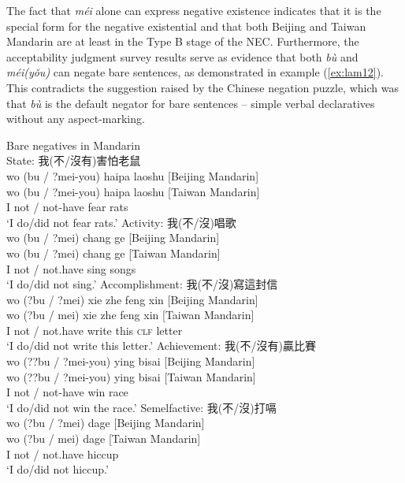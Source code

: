 \documentclass[output=paper,colorlinks,citecolor=brown,chinesefont]{langscibook}
\begin{document}
The fact that \textit{méi} alone can express negative existence indicates that it is the special form for the negative existential and that both Beijing and Taiwan Mandarin are at least in the Type B stage of the NEC. Furthermore, the acceptability judgment survey results serve as evidence that both \textit{bù} and \textit{méi(yǒu)} can negate bare sentences, as demonstrated in example (\ref{ex:lam12}). This contradicts the suggestion raised by the Chinese negation puzzle, which was that \textit{bù} is the default negator for bare sentences – simple verbal declaratives without any aspect-marking.

\let\eachwordtwo=\itshape
\ea Bare negatives in Mandarin \label{ex:lam12}\\
  \ea State: {\cn 我(不/沒有)害怕老鼠} \label{ex:lam12a}\\
  	\glll wo	{(bu / ?mei-you)}	haipa	laoshu	\textup{[Beijing Mandarin]}\\
	{wo} {(bu / ?mei-you)}	{haipa} {laoshu} \textup{[Taiwan Mandarin]}\\
	I {not / not-have} fear rats\\
	\glt `I do/did not fear rats.'
  \ex Activity: {\cn 我(不/沒)唱歌} \label{ex:lam12b}\\
  	\glll wo	{(bu / ?mei)}	chang	ge	\textup{[Beijing Mandarin]}\\
	  {wo}	{(bu / ?mei)} {chang} {ge} \textup{[Taiwan Mandarin]}\\
	I {not / not.have} sing songs\\
	\glt `I do/did not sing.'
  \ex Accomplishment: {\cn 我(不/沒)寫這封信} \label{ex:lam12c}\\
	\glll wo	 {(?bu / ?mei)} xie zhe feng xin \textup{[Beijing Mandarin]}\\
	{wo} {(?bu / mei)} {xie} {zhe} {feng} {xin} \textup{[Taiwan Mandarin]}\\
	I {not / not.have} write this \textsc{clf} letter\\
	\glt `I do/did not write this letter.'
  \ex Achievement: {\cn 我(不/沒有)贏比賽} \label{ex:lam12d}\\
  	\glll wo	 {(??bu / ?mei-you)} ying bisai \textup{[Beijing Mandarin]}\\
  	{wo} {(??bu / ?mei-you)} {ying} {bisai} \textup{[Taiwan Mandarin]}\\
  	I {not / not-have} win race\\
  	\glt `I do/did not win the race.'
  \ex Semelfactive: {\cn 我(不/沒)打嗝} \label{ex:lam12e}\\
	\glll wo {(?bu / ?mei)} dage \textup{[Beijing Mandarin]}\\
	{wo} {(?bu / mei)} {dage} \textup{[Taiwan Mandarin]}\\
	I {not / not.have} hiccup\\
	\glt `I do/did not hiccup.'
\z \z 
\end{document}
